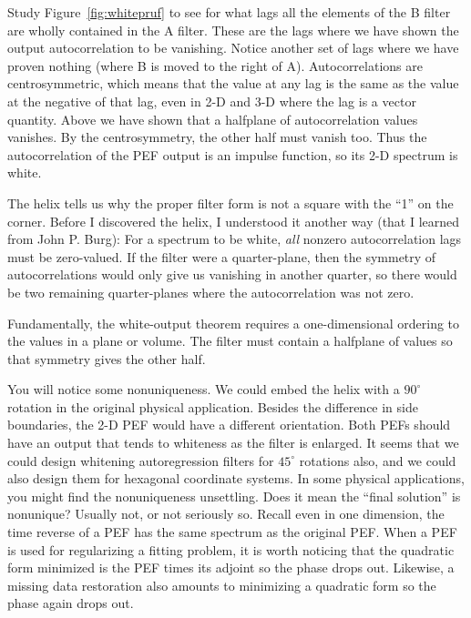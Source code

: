 \par
Study Figure~\ref{fig:whitepruf} to see for what lags
all the elements of the B filter are wholly contained in the A filter.
These are the lags
where we have shown the output autocorrelation to be vanishing.
Notice another set of lags where we have proven nothing
(where B is moved to the right of A).
Autocorrelations are centrosymmetric,
which means that the value at any lag
is the same as the value at the negative of that lag,
even in 2-D and 3-D where the lag is a vector quantity.
Above we have shown that a halfplane of autocorrelation values vanishes.
By the centrosymmetry, the other half must vanish too.
Thus the autocorrelation of the PEF output is an impulse function,
so its 2-D spectrum is white.

\par
The helix tells us why the proper filter form
is not a square with the ``1'' on the corner.
Before I discovered the helix, I understood it another way
(that I learned from John P. Burg):
For a spectrum to be white,
{\it all}
nonzero autocorrelation lags must be zero-valued.
If the filter were a quarter-plane,
then the symmetry of autocorrelations
would only give us vanishing in another quarter,
so there would be two remaining quarter-planes
where the autocorrelation was not zero.

\par
Fundamentally,
the white-output theorem requires a
one-dimensional ordering to the values in a plane or volume.
The filter must contain a halfplane of values
so that symmetry gives the other half.

\par
You will notice some nonuniqueness.
We could embed the helix
with a $90^\circ$ rotation
in the original physical application.
Besides the difference in side boundaries,
the 2-D PEF would have a different orientation.
Both PEFs should have an output that tends to whiteness as
the filter is enlarged.
It seems that we could design whitening autoregression filters
for $45^\circ$ rotations also,
and we could also design them for hexagonal coordinate systems.
In some physical applications,
you might find the nonuniqueness unsettling.
Does it mean the ``final solution'' is nonunique?
Usually not, or not seriously so.
Recall even in one dimension, the time reverse of a PEF
has the same spectrum as the original PEF.
When a PEF is used for regularizing a fitting problem,
it is worth noticing that the quadratic form minimized
is the PEF times its adjoint so the phase drops out.
Likewise, a missing data restoration also amounts to minimizing
a quadratic form so the phase again drops out.

